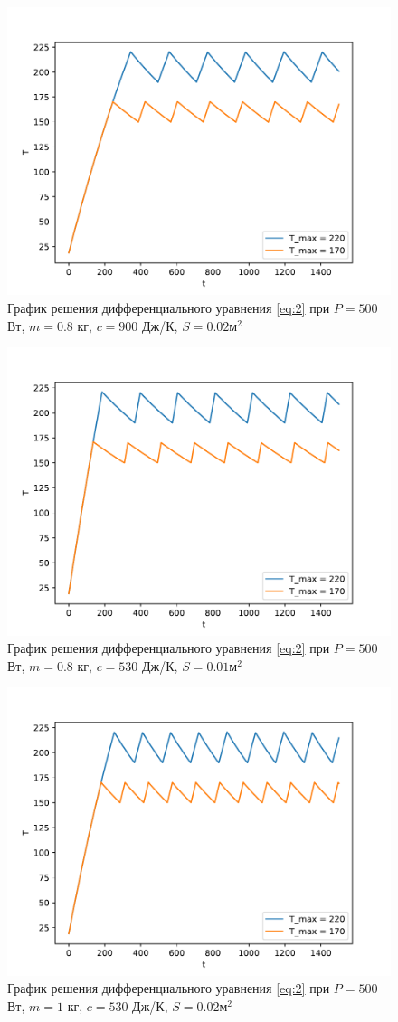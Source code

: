 \documentclass[a4paper, 14pt]{extarticle}
\begin{document}
			\begin{figure}[H]
				\centering
				\includegraphics[width = .65\linewidth]{fig3.pdf}
				\caption[.] {График решения дифференциального уравнения \eqref{eq:2} 
					при $P = 500$ Вт, $m = 0.8$ кг, $c = 900$ Дж/К, $S = 0.02 \text{м}^2$ }
			\end{figure}
			
			\begin{figure}[H]
				\centering
				\includegraphics[width = .65\linewidth]{fig4.pdf}
				\caption[.] {График решения дифференциального уравнения \eqref{eq:2} 
					при $P = 500$ Вт, $m = 0.8$ кг, $c = 530$ Дж/К, $S = 0.01 \text{м}^2$}
			\end{figure}
			
			\begin{figure}[H]
				\centering
				\includegraphics[width = .65\linewidth]{fig5.pdf}
				\caption[.] {График решения дифференциального уравнения \eqref{eq:2} 
					при $P = 500$ Вт, $m = 1$ кг, $c = 530$ Дж/К, $S = 0.02 \text{м}^2$}
			\end{figure}
			
\end{document}
